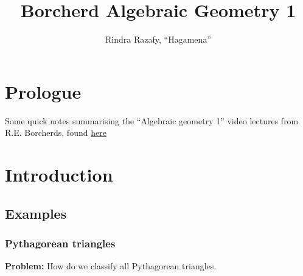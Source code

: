 
\usepackage{graphicx}
\graphicspath{ {./images/} }


\author{Rindra Razafy, ``Hagamena''}
\title{Borcherd Algebraic Geometry 1}
\setcounter{section}{-1}


\maketitle
\tableofcontents

\newpage

\section{Prologue}
Some quick notes summarising the ``Algebraic geometry 1'' video lectures from R.E. Borcherds, found \href{https://youtube.com/playlist?list=PL8yHsr3EFj53j51FG6wCbQKjBgpjKa5PX}{here} 

\newpage

\section{Introduction}
\subsection{Examples}
\subsubsection{Pythagorean triangles}
\textbf{Problem:} How do we classify all Pythagorean triangles.

